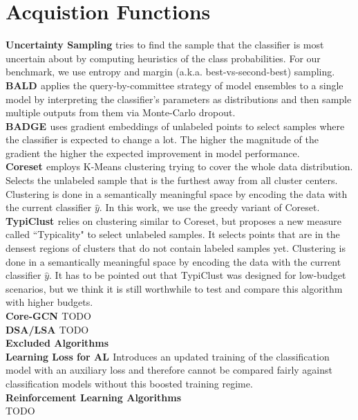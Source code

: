 \documentclass[]{article}
\begin{document}
\section{Acquistion Functions}\label{app:acquisition_functions}
\textbf{Uncertainty Sampling} 
tries to find the sample that the classifier is most uncertain about by computing heuristics of the class probabilities. For our benchmark, we use entropy and margin (a.k.a. best-vs-second-best) sampling.\\
\textbf{BALD \cite{kirsch2019batchbald}}
applies the query-by-committee strategy of model ensembles to a single model by interpreting the classifier's parameters as distributions and then sample multiple outputs from them via Monte-Carlo dropout.\\
\textbf{BADGE \cite{ashdeep}} uses gradient embeddings of unlabeled points to select samples where the classifier is expected to change a lot. The higher the magnitude of the gradient the higher the expected improvement in model performance.\\
\textbf{Coreset \cite{sener2017active}}
employs K-Means clustering trying to cover the whole data distribution.
Selects the unlabeled sample that is the furthest away from all cluster centers.
Clustering is done in a semantically meaningful space by encoding the data with the current classifier $\hat y$.
In this work, we use the greedy variant of Coreset.\\
\textbf{TypiClust \cite{hacohen2022active}}
relies on clustering similar to Coreset, but proposes a new measure called ``Typicality" to select unlabeled samples.
It selects points that are in the densest regions of clusters that do not contain labeled samples yet.
Clustering is done in a semantically meaningful space by encoding the data with the current classifier $\hat y$.
It has to be pointed out that TypiClust was designed for low-budget scenarios, but we think it is still worthwhile to test and compare this algorithm with higher budgets. \\
\textbf{Core-GCN \cite{caramalau2021sequential}} TODO \\
\textbf{DSA/LSA \cite{kim2019guiding}} TODO \\ [2mm]
%
\textbf{Excluded Algorithms}\\
\textbf{Learning Loss for AL \cite{yoo2019learning}}
Introduces an updated training of the classification model with an auxiliary loss and therefore cannot be compared fairly against classification models without this boosted training regime.\\ [1mm]
%
\textbf{Reinforcement Learning Algorithms} \\
TODO \\
\end{document}
